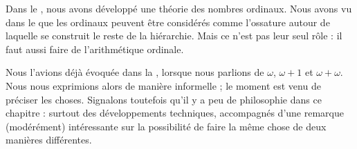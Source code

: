\documentclass[../../../include/open-logic-section]{subfiles}
\begin{document}


Dans le , nous avons développé une théorie
des nombres ordinaux. Nous avons vu dans le
 que les ordinaux peuvent être considérés
comme l'ossature autour de laquelle se construit le reste
de la hiérarchie. Mais ce n'est pas leur seul rôle : il faut
aussi faire de l'arithmétique ordinale.

Nous l'avions déjà évoquée dans la
, lorsque nous parlions de
$\omega$, $\omega+1$ et $\omega+\omega$. Nous nous
exprimions alors de manière informelle ; le moment est venu
de préciser les choses. Signalons toutefois qu'il y a peu de
philosophie dans ce chapitre : surtout des développements
techniques, accompagnés d'une remarque (modérément)
intéressante sur la possibilité de faire la même chose de
deux manières différentes.
\end{document}
